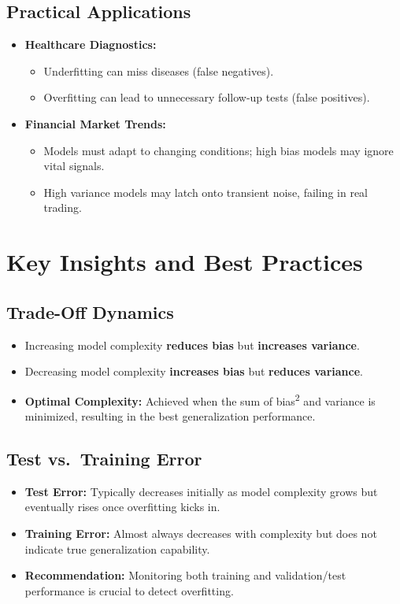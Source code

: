 \documentclass{article}
\begin{document}
\subsection{Practical Applications}
\begin{itemize}
    \item \textbf{Healthcare Diagnostics:}
    \begin{itemize}
        \item Underfitting can miss diseases (false negatives).
        \item Overfitting can lead to unnecessary follow-up tests (false positives).
    \end{itemize}
    \item \textbf{Financial Market Trends:}
    \begin{itemize}
        \item Models must adapt to changing conditions; high bias models may ignore vital signals.
        \item High variance models may latch onto transient noise, failing in real trading.
    \end{itemize}
\end{itemize}

\section{Key Insights and Best Practices}

\subsection{Trade-Off Dynamics}
\begin{itemize}
    \item Increasing model complexity \textbf{reduces bias} but \textbf{increases variance}.
    \item Decreasing model complexity \textbf{increases bias} but \textbf{reduces variance}.
    \item \textbf{Optimal Complexity:} Achieved when the sum of bias\textsuperscript{2} and variance is minimized, resulting in the best generalization performance.
\end{itemize}

\subsection{Test vs.\ Training Error}
\begin{itemize}
    \item \textbf{Test Error:} Typically decreases initially as model complexity grows but eventually rises once overfitting kicks in.
    \item \textbf{Training Error:} Almost always decreases with complexity but does not indicate true generalization capability.
    \item \textbf{Recommendation:} Monitoring both training and validation/test performance is crucial to detect overfitting.
\end{itemize}
\end{document}
